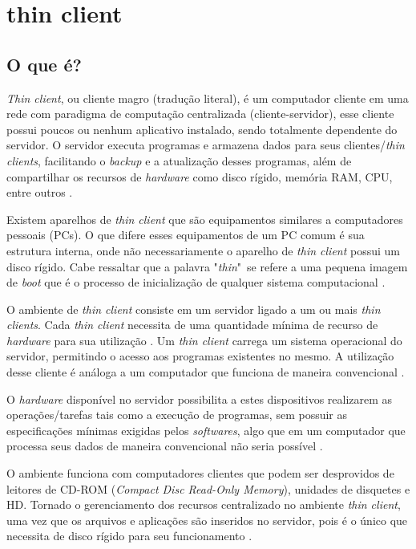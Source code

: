 \documentclass[
	12pt,				%
	openright,			%
	twoside,			%
	a4paper,			%
	chapter=TITLE,		%
	english,			%
	brazil				%
	]{abntex2}
\begin{document}
\section{thin client}
\label{refe:thinclient}
\subsection{O que é?}

\textit{Thin client}, ou cliente magro (tradução literal), é um computador cliente em uma rede  com paradigma de computação centralizada (cliente-servidor), esse cliente possui poucos ou nenhum aplicativo instalado, sendo totalmente dependente do servidor. O servidor executa programas e armazena dados para seus clientes/\textit{thin clients}, facilitando o \textit{backup} e a atualização desses programas, além de compartilhar os recursos de \textit{hardware} como disco rígido, memória RAM, CPU, entre outros \cite{ComoFuncionaThinClient, tanenbaum2010sistemas}.

Existem aparelhos de \textit{thin client} que são equipamentos similares a computadores pessoais (PCs). O que difere esses equipamentos de um PC comum é sua estrutura interna, onde não necessariamente o aparelho de \textit{thin client} possui um disco rígido. Cabe ressaltar que a palavra "\textit{thin}"\ se refere a uma pequena imagem de \textit{boot} que é o processo de inicialização de qualquer sistema computacional \cite{ComoFuncionaThinClient}.

O ambiente de \textit{thin client} consiste em um servidor ligado a um ou mais \textit{thin clients}. Cada \textit{thin client} necessita de uma quantidade mínima de recurso de \textit{hardware} para sua utilização \cite{TopologiaClienteThin}. Um \textit{thin client} carrega um sistema operacional do servidor, permitindo o acesso aos  programas existentes no mesmo. A utilização desse cliente é análoga a um computador que funciona de maneira convencional \cite{ComoFuncionaThinClient, morimotoservidores}.

O \textit{hardware} disponível no servidor possibilita a estes dispositivos realizarem as operações/tarefas tais como a execução de programas, sem possuir as especificações mínimas exigidas pelos \textit{softwares}, algo que em um computador que processa seus dados de maneira convencional não seria possível \cite{tanenbaum2010sistemas}.

O ambiente funciona com computadores clientes que podem ser desprovidos de leitores de CD-ROM (\textit{Compact Disc Read-Only Memory}), unidades de disquetes e HD. Tornado o gerenciamento dos recursos centralizado no ambiente \textit{thin client}, uma vez que os  arquivos e aplicações são inseridos no servidor, pois é o único que necessita de disco rígido para seu funcionamento \cite{tanenbaum2010sistemas, ComoFuncionaThinClient}.
\end{document}
